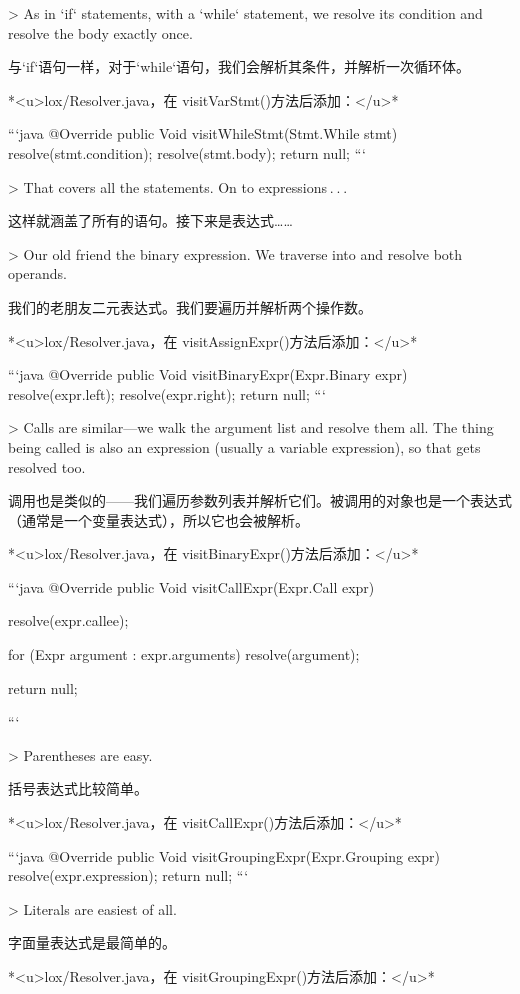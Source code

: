 \documentclass[cn,11pt,chinese]{elegantbook}
\begin{document}
{{{{{{{{{{{{{> As in `if` statements, with a `while` statement, we resolve its condition and resolve the body exactly once.

与`if`语句一样，对于`while`语句，我们会解析其条件，并解析一次循环体。

*<u>lox/Resolver.java，在 visitVarStmt()方法后添加：</u>*

```java
  @Override
  public Void visitWhileStmt(Stmt.While stmt) {
    resolve(stmt.condition);
    resolve(stmt.body);
    return null;
  }
```

> That covers all the statements. On to expressions . . . 

这样就涵盖了所有的语句。接下来是表达式……

> Our old friend the binary expression. We traverse into and resolve both operands.

我们的老朋友二元表达式。我们要遍历并解析两个操作数。

*<u>lox/Resolver.java，在 visitAssignExpr()方法后添加：</u>*

```java
  @Override
  public Void visitBinaryExpr(Expr.Binary expr) {
    resolve(expr.left);
    resolve(expr.right);
    return null;
  }
```

> Calls are similar—we walk the argument list and resolve them all. The thing being called is also an expression (usually a variable expression), so that gets resolved too.

调用也是类似的——我们遍历参数列表并解析它们。被调用的对象也是一个表达式（通常是一个变量表达式），所以它也会被解析。

*<u>lox/Resolver.java，在 visitBinaryExpr()方法后添加：</u>*

```java
  @Override
  public Void visitCallExpr(Expr.Call expr) {
    resolve(expr.callee);

    for (Expr argument : expr.arguments) {
      resolve(argument);
    }

    return null;
  }
```

> Parentheses are easy.

括号表达式比较简单。

*<u>lox/Resolver.java，在 visitCallExpr()方法后添加：</u>*

```java
  @Override
  public Void visitGroupingExpr(Expr.Grouping expr) {
    resolve(expr.expression);
    return null;
  }
```

> Literals are easiest of all.

字面量表达式是最简单的。

*<u>lox/Resolver.java，在 visitGroupingExpr()方法后添加：</u>*

}}}}}}}}}}}}}
\end{document}
